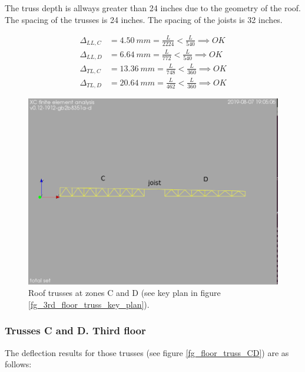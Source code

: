 \noindent The truss depth is allways greater than 24 inches due to the geometry of the roof. The spacing of the trusses is 24 inches. The spacing of the joists is 32 inches. 

\begin{align}
\Delta_{LL,C} &= 4.50\ mm= \frac{L}{2224} < \frac{L}{540} \implies OK \\
\Delta_{LL,D} &= 6.64\ mm= \frac{L}{772} < \frac{L}{540} \implies OK \\
\Delta_{TL,C} &= 13.36\ mm= \frac{L}{748} < \frac{L}{360} \implies OK \\
\Delta_{TL,D} &= 20.64\ mm= \frac{L}{462} < \frac{L}{360} \implies OK
\end{align}

\begin{figure}
  \begin{center}
  \includegraphics[width=120mm]{figures/roof_truss_CD}
  \end{center}
  \caption{Roof trusses at zones C and D (see key plan in figure \ref{fg_3rd_floor_truss_key_plan}).}\label{fg_roof_truss_CD}
\end{figure}

\subsubsection{Trusses C and D. Third floor}
The deflection results for those trusses (see figure \ref{fg_floor_truss_CD}) are as follows:

